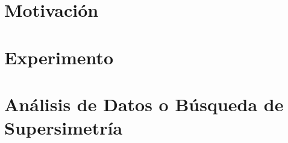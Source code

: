 \documentclass[draft]{thesis}
\begin{document}


\tableofcontents



\part{Motivaci\'on}



\part{Experimento}



\part{An\'alisis de Datos o Búsqueda de Supersimetría}











\end{document}
